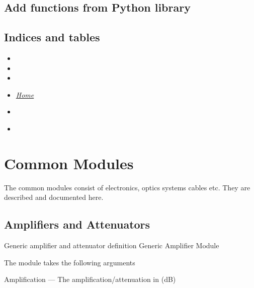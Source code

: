 \documentclass[letterpaper,10pt,english]{sphinxmanual}
\begin{document}
\subsection{Add functions from Python library}
\label{device_modules:add-functions-from-python-library}
\href{https://docs.python.org/library/io.html\#io.open}{}


\subsection{Indices and tables}
\label{device_modules:indices-and-tables}\begin{itemize}
\item {} 

\item {} 

\item {} 

\item {} 
{\hyperref[index::doc]{\emph{\emph{Home}}}}

\item {} 
{\hyperref[index:index-label]{\emph{}}}

\item {} 
{\hyperref[beam:beam-label]{\emph{}}}

\end{itemize}


\section{Common Modules}
\label{common_modules::doc}\label{common_modules:common-modules}
The common modules consist of electronics, optics systems cables etc. They are described and documented here.


\subsection{Amplifiers and Attenuators}
\label{common_modules:amplifiers-and-attenuators}
Generic amplifier and attenuator definition
\label{common_modules:module-AmpAttModule}
Generic Amplifier Module

The module takes the following arguments

Amplification --- The amplification/attenuation in (dB)
\end{document}
